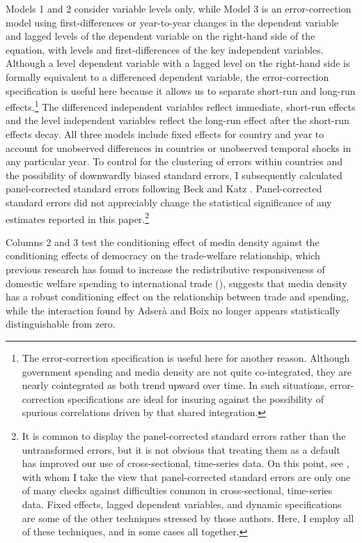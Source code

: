 \documentclass[12pt]{report}
\begin{document}
Models 1 and 2 consider variable levels only, while Model 3 is an error-correction model using
first-differences or year-to-year changes in the dependent variable and lagged levels of the
dependent variable on the right-hand side of the equation, with levels and first-differences of the
key independent variables. Although a level dependent variable with a lagged level on the right-hand
side is formally equivalent to a differenced dependent variable, the error-correction specification
is useful here because it allows us to separate short-run and long-run effects.\footnote{The
error-correction specification is useful here for another reason. Although government spending and
media density are not quite co-integrated, they are nearly cointegrated as both trend upward over
time. In such situations, error-correction specifications are ideal for insuring against the
possibility of spurious correlations driven by that shared integration.} The differenced
independent variables reflect immediate, short-run effects and the level independent variables
reflect the long-run effect after the short-run effects decay. All three models include fixed
effects for country and year to account for unobserved differences in countries or unobserved
temporal shocks in any particular year. To control for the clustering of errors within countries and
the possibility of downwardly biased standard errors, I subsequently calculated panel-corrected
standard errors following Beck and Katz \citeyearpar{Anonymous:DMdF8icE}. Panel-corrected standard
errors did not appreciably change the statistical significance of any estimates reported in this
paper.\footnote{It is common to display the panel-corrected standard errors rather than the
untransformed errors, but it is not obvious that treating them as a default has improved our use of
cross-sectional, time-series data. On this point, see \citealt{Wilson:2007kz}, with whom I take the
view that panel-corrected standard errors are only one of many checks against difficulties common in
cross-sectional, time-series data. Fixed effects, lagged dependent variables, and dynamic
specifications are some of the other techniques stressed by those authors. Here, I employ all of
these techniques, and in some cases all together.}

Columns 2 and 3 test the conditioning effect of media density against the conditioning effects of
democracy on the trade-welfare relationship, which previous research has found to increase the
redistributive responsiveness of domestic welfare spending to international trade
(\citealt{Adsera:2002vt}), suggests that media density has a robust conditioning effect on the
relationship between trade and spending, while the interaction found by Adserà and Boix no longer
appears statistically distinguishable from zero.
\end{document}
